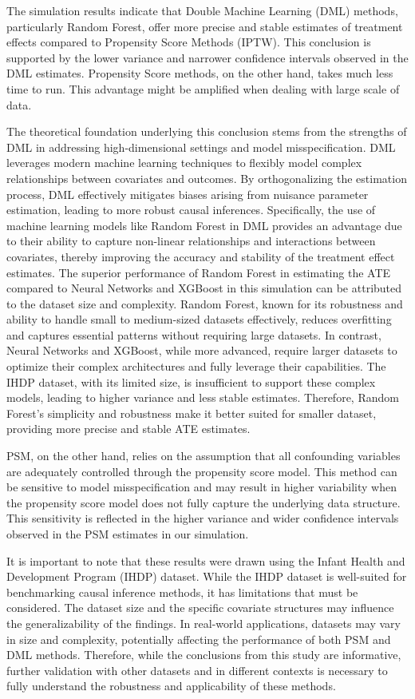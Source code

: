 \documentclass{article}
\begin{document}
The simulation results indicate that Double Machine Learning (DML) methods, particularly Random Forest, offer more precise and stable estimates of treatment effects compared to Propensity Score Methods (IPTW). This conclusion is supported by the lower variance and narrower confidence intervals observed in the DML estimates. Propensity Score methods, on the other hand, takes much less time to run. This advantage might be amplified when dealing with large scale of data.

The theoretical foundation underlying this conclusion stems from the strengths of DML in addressing high-dimensional settings and model misspecification. DML leverages modern machine learning techniques to flexibly model complex relationships between covariates and outcomes. By orthogonalizing the estimation process, DML effectively mitigates biases arising from nuisance parameter estimation, leading to more robust causal inferences. Specifically, the use of machine learning models like Random Forest in DML provides an advantage due to their ability to capture non-linear relationships and interactions between covariates, thereby improving the accuracy and stability of the treatment effect estimates. The superior performance of Random Forest in estimating the ATE compared to Neural Networks and XGBoost in this simulation can be attributed to the dataset size and complexity. Random Forest, known for its robustness and ability to handle small to medium-sized datasets effectively, reduces overfitting and captures essential patterns without requiring large datasets. In contrast, Neural Networks and XGBoost, while more advanced, require larger datasets to optimize their complex architectures and fully leverage their capabilities. The IHDP dataset, with its limited size, is insufficient to support these complex models, leading to higher variance and less stable estimates. Therefore, Random Forest's simplicity and robustness make it better suited for smaller dataset, providing more precise and stable ATE estimates.

PSM, on the other hand, relies on the assumption that all confounding variables are adequately controlled through the propensity score model. This method can be sensitive to model misspecification and may result in higher variability when the propensity score model does not fully capture the underlying data structure. This sensitivity is reflected in the higher variance and wider confidence intervals observed in the PSM estimates in our simulation.

It is important to note that these results were drawn using the Infant Health and Development Program (IHDP) dataset. While the IHDP dataset is well-suited for benchmarking causal inference methods, it has limitations that must be considered. The dataset size and the specific covariate structures may influence the generalizability of the findings. In real-world applications, datasets may vary in size and complexity, potentially affecting the performance of both PSM and DML methods. Therefore, while the conclusions from this study are informative, further validation with other datasets and in different contexts is necessary to fully understand the robustness and applicability of these methods.
\end{document}
